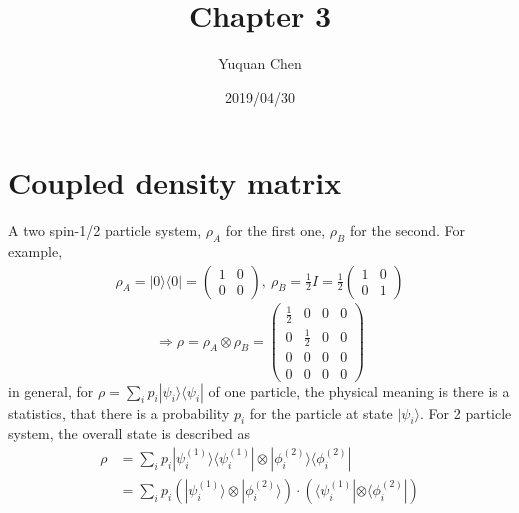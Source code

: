 \documentclass[UTF8,12pt]{article} %
\begin{document}
\title{Chapter 3}
\author{Yuquan Chen}
\date{2019/04/30} %
\maketitle

\section{Coupled density matrix}

A two spin-1/2 particle system, $\rho_{A}$ for the first one, $\rho_{B}$ for the second. For example, 
\begin{align*}
\rho_{A} = |0\rangle\langle 0| = \begin{pmatrix}1&0\\0&0\end{pmatrix},~ \rho_{B} = \frac{1}{2} I = \frac{1}{2}\begin{pmatrix}1&0\\0&1\end{pmatrix}
\end{align*}
$$\Rightarrow \rho = \rho_{A} \otimes \rho_{B} = \begin{pmatrix}\frac{1}{2}&0&0&0\\0&\frac{1}{2}&0&0\\0&0&0&0\\0&0&0&0\end{pmatrix}$$
in general, for $\rho = \sum_{i}p_{i}|\psi_{i}\rangle\langle \psi_{i}|$ of one particle, the physical meaning is there is a statistics, that there is a probability $p_{i}$ for the particle at state $|\psi_{i}\rangle$. For 2 particle system, the overall state is described as
\begin{align}
\rho &= \sum_{i}p_{i}|\psi_{i}^{(1)}\rangle\langle\psi_{i}^{(1)}| \otimes |\phi_{i}^{(2)}\rangle\langle\phi_{i}^{(2)}| \\
&= \sum_{i} p_{i}\left(|\psi_{i}^{(1)}\rangle \otimes |\phi_{i}^{(2)}\rangle\right) \cdot \left(\langle\psi_{i}^{(1)}|\otimes\langle\phi_{i}^{(2)}|\right)
\end{align}
\end{document}
